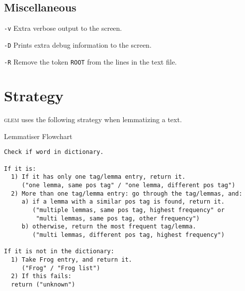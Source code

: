 \documentclass[a4paper]{article}
\def\glem{\textsc{glem}}
\newenvironment{varlist}[1]{%
\begin{list}{}{%
    \settowidth{\labelwidth}{\sf #1 }     %
    \setlength{\leftmargin}{\labelwidth}  %
    \addtolength{\leftmargin}{\labelsep}  %
    \setlength{\parsep}{0.5ex plus 0.2ex minus 0.2ex}
    \setlength{\itemsep}{0.3ex}
    \renewcommand{\makelabel}[1]{\sf ##1\hfill}}}%
{\end{list}}
\begin{document}
\begin{varlist}{wwwwwwww}
\subsection*{Miscellaneous}

\item[\texttt{-v}] Extra verbose output to the screen.

\item[\texttt{-D}] Prints extra debug information to the screen.

\item[\texttt{-R}] Remove the token \texttt{ROOT} from the
  lines in the text file.

\end{varlist}

\section*{Strategy}

\glem{} uses the following strategy when lemmatizing a text.

\begin{pabox}{Lemmatiser Flowchart}
\begin{verbatim}
Check if word in dictionary.

If it is:
  1) If it has only one tag/lemma entry, return it.
     ("one lemma, same pos tag" / "one lemma, different pos tag")
  2) More than one tag/lemma entry: go through the tag/lemmas, and:
     a) if a lemma with a similar pos tag is found, return it.
        ("multiple lemmas, same pos tag, highest frequency" or
         "multi lemmas, same pos tag, other frequency")
     b) otherwise, return the most frequent tag/lemma.
        ("multi lemmas, different pos tag, highest frequency")
 
If it is not in the dictionary:
  1) Take Frog entry, and return it.
     ("Frog" / "Frog list")
  2) If this fails:
  return ("unknown")
\end{verbatim}
\end{pabox}

\begin{comment}
\begin{config}{e2}
    "MLDTHF" : "multi lemmas, no pos tag match, highest frequency", #DT=different tag
    "MLNTHF" : "multi lemmas, no tag, highest frequency",
    "MLSTHF" : "multi lemmas, pos tag match, and highest frequency",
    "MLNTHF" : "multi lemmas, no tag, highest frequency",
    "MLSTOF" : "multi lemmas, pos tag match, but other frequency",
    "MLNTOF" : "multi lemmas, no tag, other frequency",
    "OLDT"   : "one lemma, but different pos tag",
    "OLST"   : "one lemma, same pos tag",
    "OLNT"   : "one lemma, no tag",
    "FROG"   : "Frog lemma",
    "UNKNOWN": "unknown"
\end{config}
\end{comment}
\end{document}
